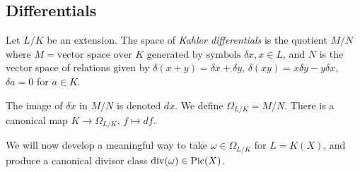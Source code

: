 \documentclass[10pt,a4paper,rgb]{article}
\begin{document}
\subsection{Differentials}
Let $L/K$ be an extension. The space of \emph{Kahler differentials} is the quotient $M/N$ where $M = \text{vector space over $K$ generated by symbols } \delta x, x \in L$, and $N$ is the vector space of relations given by $\delta(x+y)=\delta x+\delta y$, $\delta(xy) = x\delta y-y\delta x$, $\delta a =0$ for $a \in K$. 

The image of $\delta x$ in $M/N$ is denoted $dx$. We define $\Omega_{L/K} = M/N$. There is a canonical map $K \to \Omega_{L/K}$, $f \mapsto df$.

We will now develop a meaningful way to take $\omega \in \Omega_{L/K}$ for $L = K(X)$, and produce a canonical divisor class $\operatorname{div}(\omega) \in \operatorname{Pic}(X)$.
\end{document}

